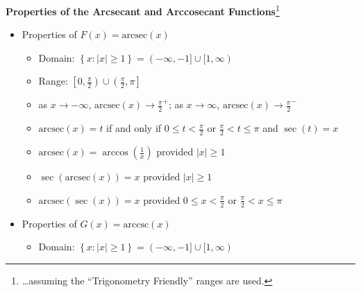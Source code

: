 \colorbox{ResultColor}{\bbm

\begin{thm} \label{arcsecantcosecantfunctionprops1}  \textbf{Properties of the Arcsecant and Arccosecant Functions}\footnote{\ldots assuming the ``Trigonometry Friendly'' ranges are used.} 

\begin{itemize}

\item Properties of $F(x)= \mbox{arcsec}(x)$  

\begin{itemize}

\item Domain:  $\left\{ x : |x| \geq 1 \right\} = (-\infty, -1] \cup [1,\infty)$

\item Range:  $\left[0, \frac{\pi}{2} \right) \cup \left(\frac{\pi}{2}, \pi\right]$

\item  as $x \rightarrow -\infty$, $\mbox{arcsec}(x) \rightarrow \frac{\pi}{2}^{+}$;  as $x \rightarrow \infty$, $\mbox{arcsec}(x) \rightarrow \frac{\pi}{2}^{-}$

\item  $\mbox{arcsec}(x) = t$ if and only if $0 \leq t < \frac{\pi}{2}$ or $ \frac{\pi}{2} < t \leq \pi$ and $\sec(t) = x$

\item  $\mbox{arcsec}(x) = \arccos\left(\frac{1}{x}\right)$ provided $|x| \geq 1$

\item  $\sec\left(\mbox{arcsec}(x)\right) = x$ provided $|x| \geq 1$

\item  $\mbox{arcsec}(\sec(x)) = x$ provided $0 \leq x < \frac{\pi}{2}$ or $\frac{\pi}{2} < x \leq \pi$

\end{itemize}

\item  Properties of $G(x) = \mbox{arccsc}(x)$  

\begin{itemize}

\item  Domain:  $\left\{ x : |x| \geq 1 \right\} = (-\infty, -1] \cup [1,\infty)$


\end{itemize}
\end{itemize}
\end{thm}}
